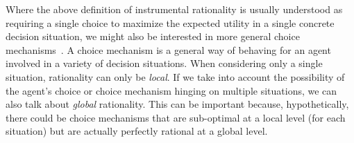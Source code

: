 \documentclass[a4paper]{article}
\begin{document}
%
Where the above definition of instrumental rationality is usually understood as requiring a single choice to maximize the expected utility in a single concrete decision situation, we might also be interested in more general choice mechanisms~\parencite[\emph{e.g.}][]{ZollmanSmead2010:Plasticity-and-,HagenChater2012:Decision-Making,FawcettHamblin2013:Exposing-the-be,GaleazziFranke2016:Smart-Transform}.
A choice mechanism is a general way of behaving for an agent involved in a variety of decision situations.
When considering only a single situation, rationality can only be \emph{local}.
If we take into account the possibility of the agent's choice or choice mechanism hinging on multiple situations, we can also talk about \emph{global} rationality.
This can be important because, hypothetically, there could be choice mechanisms that are sub-optimal at a local level (for each situation) but are actually perfectly rational at a global level.

\end{document}
